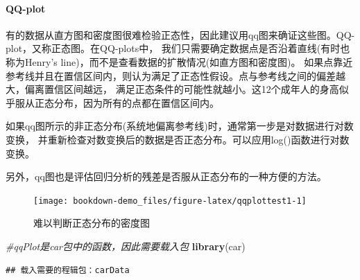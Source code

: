 \documentclass[
]{article}
\newenvironment{Shaded}{\begin{snugshade}}{\end{snugshade}}
\newcommand{\CommentTok}[1]{\textcolor[rgb]{0.56,0.35,0.01}{\textit{#1}}}
\newcommand{\DataTypeTok}[1]{\textcolor[rgb]{0.13,0.29,0.53}{#1}}
\newcommand{\DecValTok}[1]{\textcolor[rgb]{0.00,0.00,0.81}{#1}}
\newcommand{\KeywordTok}[1]{\textcolor[rgb]{0.13,0.29,0.53}{\textbf{#1}}}
\newcommand{\NormalTok}[1]{#1}
\newcommand{\OperatorTok}[1]{\textcolor[rgb]{0.81,0.36,0.00}{\textbf{#1}}}
\newcommand{\StringTok}[1]{\textcolor[rgb]{0.31,0.60,0.02}{#1}}
\begin{document}
\hypertarget{qq-plot}{%
\paragraph{QQ-plot}\label{qq-plot}}

有的数据从直方图和密度图很难检验正态性，因此建议用qq图来确证这些图。QQ-plot，又称正态图。在QQ-plots中，
我们只需要确定数据点是否沿着直线(有时也称为Henry's line)，而不是查看数据的扩散情况(如直方图和密度图)。
如果点靠近参考线并且在置信区间内，则认为满足了正态性假设。点与参考线之间的偏差越大，偏离置信区间越远，
满足正态条件的可能性就越小。这12个成年人的身高似乎服从正态分布，因为所有的点都在置信区间内。

如果qq图所示的非正态分布(系统地偏离参考线)时，通常第一步是对数据进行对数变换，
并重新检查对数变换后的数据是否正态分布。可以应用log()函数进行对数变换。

另外，qq图也是评估回归分析的残差是否服从正态分布的一种方便的方法。

\begin{figure}

{\centering \texttt{[image: bookdown-demo\_files/figure-latex/qqplottest1-1]} 

}

\caption{难以判断正态分布的密度图}\label{fig:qqplottest1}
\end{figure}

\begin{Shaded}
\begin{Highlighting}[]
\CommentTok{#qqPlot是car包中的函数，因此需要载入包}
\KeywordTok{library}\NormalTok{(car)}
\end{Highlighting}
\end{Shaded}

\begin{verbatim}
## 载入需要的程辑包：carData
\end{verbatim}

\begin{Shaded}
\end{Shaded}
\end{document}
